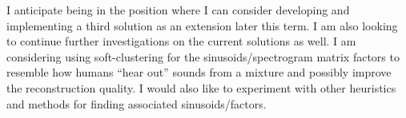 \documentclass[12pt]{article}
\begin{document}
I anticipate being in the position where I can consider developing and implementing a third solution as an extension later this term. I am also looking to continue further investigations on the current solutions as well. I am considering using soft-clustering for the sinusoids/spectrogram matrix factors to resemble how humans ``hear out'' sounds from a mixture and possibly improve the reconstruction quality. I would also like to experiment with other heuristics and methods for finding associated sinusoids/factors.
\end{document}
